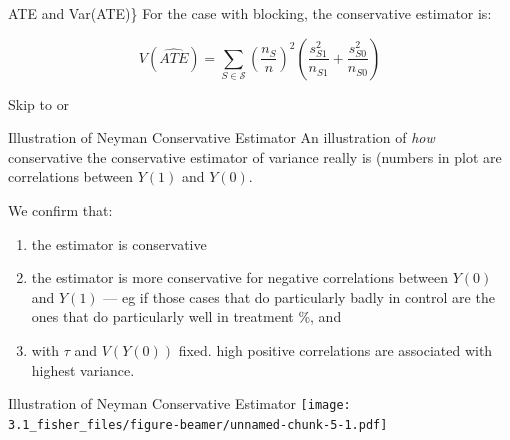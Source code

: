\documentclass[
  11pt,
  ignorenonframetext,
]{beamer}
\providecommand{\tightlist}{%
  \setlength{\itemsep}{0pt}\setlength{\parskip}{0pt}}\usepackage{longtable,booktabs,array}
\begin{document}
\begin{frame}{ATE and Var(ATE)\}}
\protect\hypertarget{ate-and-varate}{}
For the case with blocking, the conservative estimator is:

\begin{equation*} V(\widehat{ATE})   = {\sum_{S\in \mathcal{S}}{\left(\frac{n_{S}}{n}\right)^2} \left({\frac{s^2_{S1}}{n_{S1}}} + {\frac{s^2_{S0}}{n_{S0}}} \right)}  \end{equation*}

Skip to \hyperlink{CA}{} or
\hyperlink{ideas}{}
\end{frame}

\begin{frame}{Illustration of Neyman Conservative Estimator}
\protect\hypertarget{illustration-of-neyman-conservative-estimator}{}
An illustration of \textit{how} conservative the conservative estimator
of variance really is (numbers in plot are correlations between \(Y(1)\)
and \(Y(0)\).

We confirm that:

\begin{enumerate}
\tightlist
\item
  the estimator is conservative
\item
  the estimator is more conservative for negative correlations between
  \(Y(0)\) and \(Y(1)\) --- eg if those cases that do particularly badly
  in control are the ones that do particularly well in treatment \%, and
\item
  with \(\tau\) and \(V(Y(0))\) fixed. high positive correlations are
  associated with highest variance.
\end{enumerate}
\end{frame}

\begin{frame}{Illustration of Neyman Conservative Estimator}
\protect\hypertarget{illustration-of-neyman-conservative-estimator-1}{}
\texttt{[image: 3.1\_fisher\_files/figure-beamer/unnamed-chunk-5-1.pdf]}
\end{frame}
\end{document}
